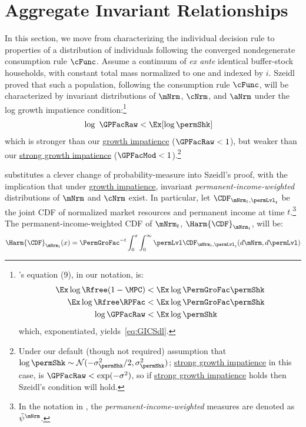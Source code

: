 \documentclass[BufferStockTheory]{subfiles}
\begin{document}
\section{Aggregate Invariant Relationships}
In this section, we move from characterizing the individual decision rule to properties of a distribution of individuals following the converged nondegenerate consumption rule $\cFunc$.
Assume a continuum of \textit{ex ante} identical buffer-stock households, with constant total mass normalized to one and indexed by $i$.
Szeidl~\citeyearpar{szeidlInvariant} proved that such a population, following the consumption rule $\cFunc$, will be characterized by invariant distributions of $\mNrm$, $\cNrm$, and $\aNrm$ under the log growth impatience condition:\footnote{\cite{szeidlInvariant}'s equation (9), in our notation, is:
  \begin{align*}
    \Ex \log \Rfree (1-\MPC) & < \Ex \log \PermGroFac \permShk
    \\  \Ex \log \Rfree \RPFac  &  < \Ex \log \PermGroFac \permShk
    \\ \log \GPFacRaw & < \Ex \log \permShk
  \end{align*}
  which, exponentiated, yields~\eqref{eq:GICSdl}.}
\hypertarget{GICSdl}{}
\begin{align}
   \log~\GPFacRaw & < \Ex [\log \permShk] \label{eq:GICSdl}
\end{align}
which is stronger than our \hyperlink{GICRaw}{growth impatience} ($\GPFacRaw < 1$), but weaker than our \hyperlink{GICMod}{strong growth impatience}  ($\GPFacMod < 1$).\footnote{Under our default (though not required) assumption that $\log \permShk \sim \mathcal{N}(-\sigma^{2}_{\permShk}/2,\sigma^{2}_{\permShk})$; \hyperlink{GICMod}{strong growth impatience} in this case, is $\GPFacRaw < \exp(-\sigma^{2})$, so if \hyperlink{GICMod}{strong growth impatience} holds then Szeidl's condition will hold.}

\hypertarget{Growth-Rates-of-Aggregate-Income-and-Consumption}{}

\cite{harmenbergInvariant} substitutes a clever change of probability-measure into Szeidl's proof, with the implication that under \hyperlink{GIC}{growth impatience}, invariant \emph{permanent-income-weighted} distributions of $\mNrm$ and $\cNrm$ exist.
In particular, let $\CDF_{\mNrm_{t},\permLvl_{t}}$ be the joint CDF of normalized market resources and permanent income at time $t$.\footnote{In the notation in \cite{harmenbergInvariant}, the \emph{permanent-income-weighted} measures are denoted as $\tilde{\psi}^{\mNrm}$.} The permanent-income-weighted CDF of $\mNrm_{t}$, $\Harm{\CDF}_{\mNrm_{t}}$, will be:
%
%
%
\begin{equation}\label{eq:HarmCDF}
\Harm{\CDF}_{\mNrm_{t}}(x) = \PermGroFac^{-t}\int_{0}^{x}\int_{0}^{\infty} \permLvl\CDF_{\mNrm_{t},\permLvl_{t}}(d\mNrm,d\permLvl)
\end{equation}
\end{document}
